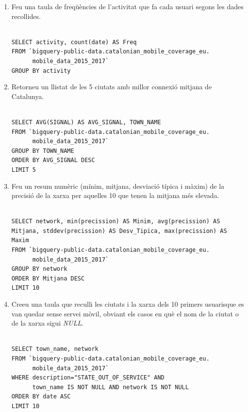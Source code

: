 \documentclass[12pt,longbibliography]{article}
\theoremstyle{definition}
\theoremstyle{remark}
\begin{document}
\begin{enumerate}

\item Feu una taula de freqüències de l'activitat que fa cada usuari segons les dades recollides.

\begin{Verbatim}[frame=single]

SELECT activity, count(date) AS Freq
FROM `bigquery-public-data.catalonian_mobile_coverage_eu.
      mobile_data_2015_2017`
GROUP BY activity

\end{Verbatim}

\item Retorneu un llistat de les 5 ciutats amb millor connexió mitjana de Catalunya.

\begin{Verbatim}[frame=single]

SELECT AVG(SIGNAL) AS AVG_SIGNAL, TOWN_NAME
FROM `bigquery-public-data.catalonian_mobile_coverage_eu.
      mobile_data_2015_2017`
GROUP BY TOWN_NAME
ORDER BY AVG_SIGNAL DESC
LIMIT 5
\end{Verbatim}

\item Feu un resum numèric (mínim, mitjana, desviació típica i màxim) de la precisió de la xarxa per aquelles 10 que tenen la mitjana més elevada.

\begin{Verbatim}[frame=single]

SELECT network, min(precission) AS Minim, avg(precission) AS 
Mitjana, stddev(precission) AS Desv_Tipica, max(precission) AS 
Maxim
FROM `bigquery-public-data.catalonian_mobile_coverage_eu.
      mobile_data_2015_2017`
GROUP BY network
ORDER BY Mitjana DESC
LIMIT 10
\end{Verbatim}

\item Creeu una taula que reculli les ciutats i la xarxa dels 10 primers usuarisque es van quedar sense servei mòvil, obviant els casos en què el nom de la ciutat o de la xarxa sigui \textit{NULL}.

\begin{Verbatim}[frame=single]

SELECT town_name, network
FROM `bigquery-public-data.catalonian_mobile_coverage_eu.
      mobile_data_2015_2017`
WHERE description="STATE_OUT_OF_SERVICE" AND 
      town_name IS NOT NULL AND network IS NOT NULL
ORDER BY date ASC
LIMIT 10
\end{Verbatim}


\end{enumerate}
\end{document}

